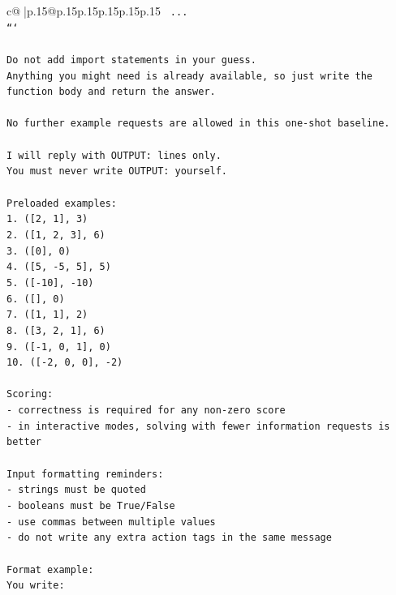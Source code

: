 \documentclass{article}
\begin{document}
{\begin{supertabular}{c@{$\;$}|p{.15\linewidth}@{}p{.15\linewidth}p{.15\linewidth}p{.15\linewidth}p{.15\linewidth}p{.15\linewidth}}
{{{\texttt{    ...} \\
\texttt{```} \\
\\ 
\texttt{Do not add import statements in your guess.} \\
\texttt{Anything you might need is already available, so just write the function body and return the answer.} \\
\\ 
\texttt{No further example requests are allowed in this one{-}shot baseline.} \\
\\ 
\texttt{I will reply with OUTPUT: lines only.} \\
\texttt{You must never write OUTPUT: yourself.} \\
\\ 
\texttt{Preloaded examples:} \\
\texttt{1. ({[}2, 1{]}, 3)} \\
\texttt{2. ({[}1, 2, 3{]}, 6)} \\
\texttt{3. ({[}0{]}, 0)} \\
\texttt{4. ({[}5, {-}5, 5{]}, 5)} \\
\texttt{5. ({[}{-}10{]}, {-}10)} \\
\texttt{6. ({[}{]}, 0)} \\
\texttt{7. ({[}1, 1{]}, 2)} \\
\texttt{8. ({[}3, 2, 1{]}, 6)} \\
\texttt{9. ({[}{-}1, 0, 1{]}, 0)} \\
\texttt{10. ({[}{-}2, 0, 0{]}, {-}2)} \\
\\ 
\texttt{Scoring:} \\
\texttt{{-} correctness is required for any non{-}zero score} \\
\texttt{{-} in interactive modes, solving with fewer information requests is better} \\
\\ 
\texttt{Input formatting reminders:} \\
\texttt{{-} strings must be quoted} \\
\texttt{{-} booleans must be True/False} \\
\texttt{{-} use commas between multiple values} \\
\texttt{{-} do not write any extra action tags in the same message} \\
\\ 
\texttt{Format example:} \\
\texttt{You write:} \\
}}}
\end{supertabular}}
\end{document}
